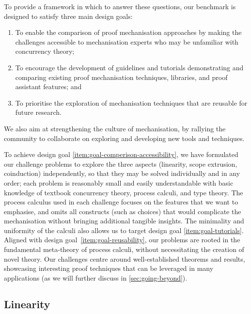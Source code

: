 \documentclass[runningheads]{llncs}
\begin{document}
To provide a framework in which to answer these questions, our benchmark is designed to satisfy three main design goals:
\begin{enumerate}[label=\textbf{(G\arabic*)},leftmargin=10mm]
\item\label{item:goal-comperison-accessibility} To enable the comparison of
  proof mechanisation approaches by making the challenges accessible to
  mechanisation experts who may be unfamiliar with concurrency theory;

\item\label{item:goal-tutorials} To encourage the development of guidelines and
  tutorials demonstrating and comparing existing proof mechanisation
  techniques, libraries, and proof assistant features; and

\item\label{item:goal-reusability} To prioritise the exploration of mechanisation
  techniques that are reusable for future research.
\end{enumerate}
We also aim at strengthening the culture of mechanisation, by rallying the community to collaborate on exploring and developing new tools and techniques.

To achieve design goal \ref{item:goal-comperison-accessibility}, we have
formulated our challenge problems to explore the three aspects
(linearity, scope extrusion, coinduction) independently, so that they
may be solved individually and in any order; each problem is
reasonably small and easily understandable with basic knowledge of
textbook concurrency theory, process calculi, and type theory.  The
process calculus used in each challenge focuses on the features that
we want to emphasise, and omits all constructs (such as choices) that
would complicate the mechanisation without bringing additional
tangible insights.  The minimality and uniformity of the
calculi also allows us to target design goal
\ref{item:goal-tutorials}.
Aligned with design goal~\ref{item:goal-reusability}, our problems are rooted in the fundamental meta-theory of process calculi, without necessitating the creation of novel theory.
Our challenges centre around well-established theorems and results, showcasing interesting proof techniques that can be leveraged in many applications (as we will further discuss in \cref{sec:going-beyond}).

\subsection{Linearity}
\end{document}
